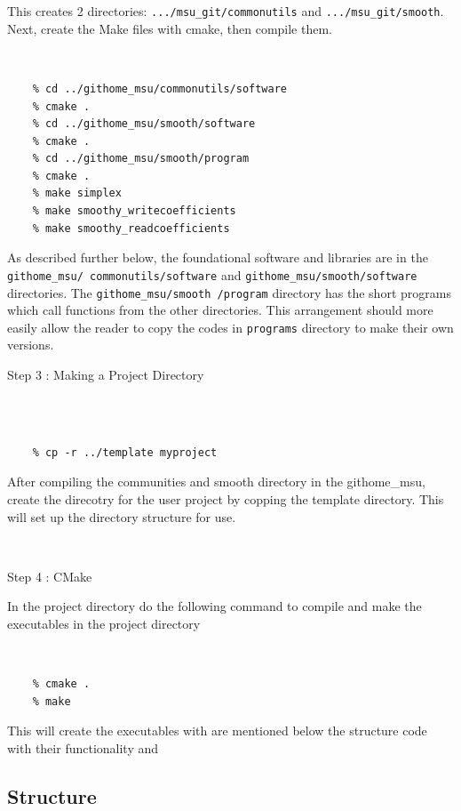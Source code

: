 \documentclass[12pt]{article}
\numberwithin{equation}{section}
\numberwithin{figure}{section}
\begin{document}
This creates 2 directories: {\tt .../msu\_git/commonutils} and {\tt .../msu\_git/smooth}. Next, create the Make files with cmake, then compile them.
{\tt 
\begin{verbatim}
    % cd ../githome_msu/commonutils/software
    % cmake .
    % cd ../githome_msu/smooth/software
    % cmake .
    % cd ../githome_msu/smooth/program
    % cmake .
    % make simplex
    % make smoothy_writecoefficients
    % make smoothy_readcoefficients
\end{verbatim}
}
As described further below, the foundational software and libraries are in the {\tt githome\_msu/ commonutils/software} and {\tt githome\_msu/smooth/software} directories. The {\tt githome\_msu/smooth /program} directory has the short programs which call functions from the other directories. This arrangement should more easily allow the reader to copy the codes in {\tt programs} directory to make their own versions.



\begin{description}
\item[Step 3 : Making a Project Directory] 
\end{description}
{\tt 
\begin{verbatim}

    % cp -r ../template myproject
\end{verbatim}
}
After compiling the communities and smooth directory in the githome\_msu, create the direcotry for the user project by copping the template directory. 
This will set up the directory structure for use. 

\\ 

\begin{description}
\item[Step 4 : CMake]
\end{description}

In the project directory do the following command to compile and make the executables in the project directory  

{\tt 
\begin{verbatim}
    % cmake . 
    % make  
\end{verbatim}
}

This will create the executables with are mentioned below the structure code with their functionality and 

\subsection{Structure}
\end{document}
